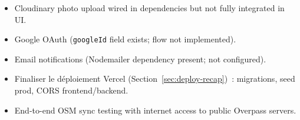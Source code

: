 \documentclass[11pt,a4paper]{article}
\begin{document}
\begin{itemize}
  \item Cloudinary photo upload wired in dependencies but not fully integrated in UI.
  \item Google OAuth (\texttt{googleId} field exists; flow not implemented).
  \item Email notifications (Nodemailer dependency present; not configured).
  \item Finaliser le déploiement Vercel (Section~\ref{sec:deploy-recap})~: migrations, seed prod, CORS frontend/backend.
  \item End-to-end OSM sync testing with internet access to public Overpass servers.
\end{itemize}
\end{document}
